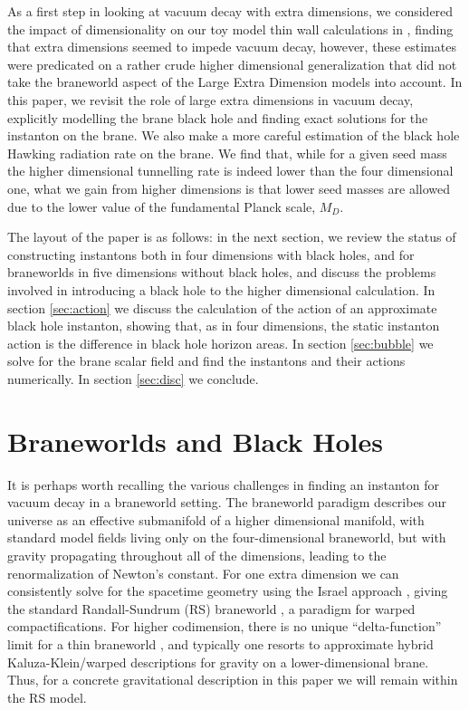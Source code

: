 \documentclass[aps,12pt,prd,superscriptaddress,preprintnumbers, 
	amssymb,
	amsmath,
	notitlepage,
	longbibliography,
	nofootinbib]{revtex4-1}
\begin{document}
As a first step in looking at vacuum decay with extra dimensions,
we considered the impact of dimensionality on our toy model thin 
wall calculations in \cite{BGM2}, finding that extra dimensions seemed 
to impede vacuum decay, however, these estimates were predicated 
on a rather crude higher dimensional generalization that did not take 
the braneworld aspect of the Large Extra Dimension models into account. 
In this paper, we revisit the role of large
extra dimensions in vacuum decay, explicitly modelling the brane black 
hole and finding exact solutions for the instanton on the brane.
We also make a more careful estimation of the black hole
Hawking radiation rate on the brane. We find that, while for a
given seed mass the higher dimensional tunnelling rate is
indeed lower than the four dimensional one, what we gain from
higher dimensions is that lower seed masses are allowed due to the
lower value of the fundamental Planck scale, $M_D$.

The layout of the paper is as follows: in the next section, we review
the status of constructing instantons both in four dimensions
with black holes, and for braneworlds in five dimensions without
black holes, and discuss the problems involved in introducing
a black hole to the higher dimensional calculation. In section
\ref{sec:action} we discuss the calculation of the action of an
approximate black hole instanton, showing that, as in four
dimensions, the static instanton action is the difference in black hole
horizon areas. In section \ref{sec:bubble} we solve for the brane
scalar field and find the instantons and their actions numerically.
In section \ref{sec:disc} we conclude.

\section{Braneworlds and Black Holes}

It is perhaps worth recalling the various challenges in finding 
an instanton for vacuum decay in a braneworld setting.
The braneworld paradigm describes our universe as an effective
submanifold of a higher dimensional manifold, with standard
model fields living only on the four-dimensional braneworld, but
with gravity propagating throughout all of the dimensions, leading
to the renormalization of Newton's constant. For one extra
dimension we can consistently solve for the spacetime geometry
using the Israel approach \cite{Israel:1966}, giving the standard
Randall-Sundrum (RS) braneworld \cite{Randall:1999vf}, a 
paradigm for warped compactifications.
For higher codimension, there is no unique ``delta-function'' limit for
a thin braneworld \cite{Geroch:1987qn}, and typically one resorts
to approximate hybrid Kaluza-Klein/warped descriptions for gravity 
on a lower-dimensional brane. Thus, for a concrete gravitational 
description in this paper we will remain within the RS model.
\end{document}
